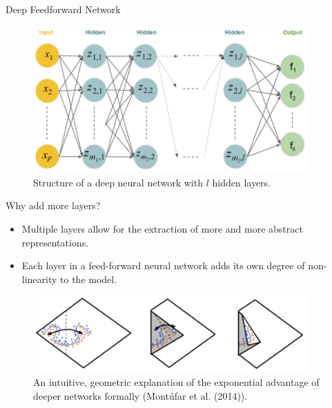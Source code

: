 
\begin{vbframe}{Deep Feedforward Network}
  \lz
  \begin{figure}
    \centering
      \includegraphics[width=10.5cm]{figure/deepneuralnet_new.png}
      \caption{Structure of a deep neural network with $l$ hidden layers.}
  \end{figure}
\end{vbframe}  

\begin{vbframe}{Why add more layers?}
\begin{itemize}
\item Multiple layers allow for the extraction of more and more abstract
representations.
\lz
\item Each layer in a feed-forward neural network adds its own degree of non-linearity to the model.
\end{itemize}
\lz
\begin{figure}
\centering
\includegraphics[width=10.5cm]{figure/folding}
\caption{An intuitive, geometric explanation of the exponential advantage of deeper networks formally (Mont\'{u}far et al. (2014)).}
\end{figure}
\end{vbframe}

